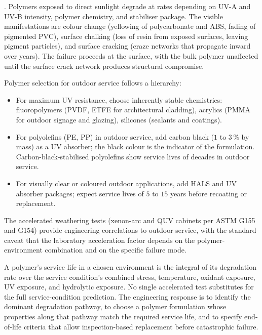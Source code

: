 . Polymers exposed to
direct sunlight degrade at rates depending on UV-A and UV-B
intensity, polymer chemistry, and stabiliser package. The visible
manifestations are colour change (yellowing of polycarbonate and
ABS, fading of pigmented PVC), surface chalking (loss of resin from
exposed surfaces, leaving pigment particles), and surface cracking
(craze networks that propagate inward over years). The failure
proceeds at the surface, with the bulk polymer unaffected until the
surface crack network produces structural compromise.

Polymer selection for outdoor service follows a hierarchy:

\begin{itemize}[leftmargin=*]
\item For maximum UV resistance, choose inherently stable chemistries:
  fluoropolymers (PVDF, ETFE for architectural cladding), acrylics
  (PMMA for outdoor signage and glazing), silicones (sealants and
  coatings).
\item For polyolefins (PE, PP) in outdoor service, add carbon black
  ($1$ to $3\,\%$ by mass) as a UV absorber; the black colour is
  the indicator of the formulation. Carbon-black-stabilised
  polyolefins show service lives of decades in outdoor service.
\item For visually clear or coloured outdoor applications, add HALS
  and UV absorber packages; expect service lives of $5$ to $15$
  years before recoating or replacement.
\end{itemize}

The accelerated weathering tests (xenon-arc and QUV cabinets per
ASTM G155 and G154) provide engineering correlations to outdoor
service, with the standard caveat that the laboratory acceleration
factor depends on the polymer-environment combination and on the
specific failure mode.

\begin{principle}
A polymer's service life in a chosen environment is the integral of
its degradation rate over the service condition's combined stress,
temperature, oxidant exposure, UV exposure, and hydrolytic exposure.
No single accelerated test substitutes for the full service-condition
prediction. The engineering response is to identify the dominant
degradation pathway, to choose a polymer formulation whose properties
along that pathway match the required service life, and to specify
end-of-life criteria that allow inspection-based replacement before
catastrophic failure.
\end{principle}

